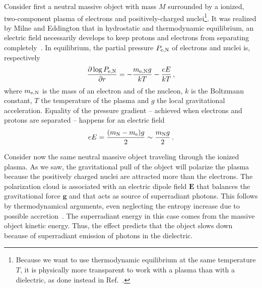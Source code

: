 \documentclass[11pt]{article}
\newcommand{\be}{\begin{equation}}
\newcommand{\ee}{\end{equation}}
\numberwithin{equation}{section} %
\begin{document}
Consider first a neutral massive object with mass $M$ surrounded by a ionized, two-component plasma of electrons and positively-charged nuclei\footnote{
Because we want to use thermodynamic equilibrium at the same temperature $T$, it is physically more transparent to work with a plasma than with a dielectric, as done instead in Ref.~\cite{Bekenstein:1998nt}.}. It was realized by Milne and Eddington that
in hydrostatic and thermodynamic equilibrium, an electric field necessarily develops to keep protons and electrons from separating completely~\cite{Milne,Eddington,1979ApJ...229..694M}. In equilibrium, the partial pressure $P_{\rm e, N}$ of electrons and nuclei is, respectively 
%
\be
\frac{\partial \log P_{\rm e, N}}{\partial r}=-\frac{m_{\rm e, N} g}{kT}-\frac{eE}{kT}\,,
\ee
%
where $m_{\rm e, N}$ is the mass of an electron and of the nucleon, $k$ is the Boltzmann constant, $T$ the temperature of the plasma
and $g$ the local gravitational acceleration.
Equality of the pressure gradient -- achieved when electrons and protons are separated -- happens for an electric field
%
\be
eE=\frac{(m_{\rm N}-m_{\rm e})g}{2}\sim \frac{m_{\rm N}g}{2}\,.
\ee
%

Consider now the same neutral massive object traveling through the ionized plasma. As we saw, the gravitational pull of the object will polarize the plasma because the positively charged nuclei are attracted more than the electrons. The polarization cloud is associated with an electric dipole field $\mathbf{E}$ that balances the gravitational force $\mathbf{g}$ and that acts as source of superradiant photons. This follows by thermodynamical arguments, even neglecting the entropy increase due to possible accretion~\cite{Bekenstein:1998nt}. The superradiant energy in this case comes from the massive object kinetic energy. Thus, the effect predicts that the object slows down because of superradiant emission of photons in the dielectric. 
\end{document}
